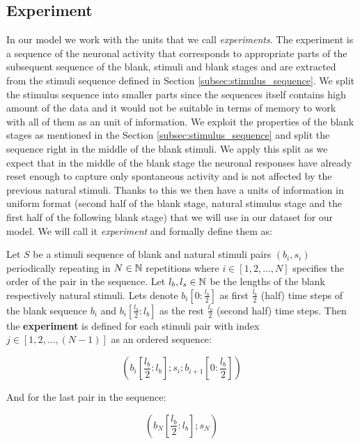 \subsection{Experiment}
\label{subsec:experiment}
In our model we work with the units that we call \emph{experiments}. The experiment is a sequence of the neuronal activity that corresponds to appropriate parts of the subsequent sequence of the blank, stimuli and blank stages and are extracted from the stimuli sequence defined in Section \ref{subsec:stimulus_sequence}. We split the stimulus sequence into smaller parts since the sequences itself contains high amount of the data and it would not be suitable in terms of memory to work with all of them as an unit of information. We exploit the properties of the blank stages as mentioned in the Section \ref{subsec:stimulus_sequence} and split the sequence right in the middle of the blank stimuli. We apply this split as we expect that in the middle of the blank stage the neuronal responses have already reset enough to capture only spontaneous activity and is not affected by the previous natural stimuli. Thanks to this we then have a units of information in uniform format (second half of the blank stage, natural stimulus stage and the first half of the following blank stage) that we will use in our dataset for our model. We will call it \emph{experiment} and formally define them as:

\begin{defn}[Experiment]
    Let $S$ be a stimuli sequence of blank and natural stimuli pairs $(b_i, s_i)$ periodically repeating in $N \in \mathbb{N}$ repetitions where $i \in [1, 2, \dots, N]$ specifies the order of the pair in the sequence. Let $l_{b}, l_{s} \in \mathbb{N}$ be the lengths of the blank respectively natural stimuli. Lets denote $b_i[0:\frac{l_b}{2}]$ as first $\frac{l_b}{2}$ (half) time steps of the blank sequence $b_i$ and $b_i[\frac{l_b}{2}:l_b]$ as the rest $\frac{l_b}{2}$ (second half) time steps. Then the \textbf{experiment} is defined for each stimuli pair with index $j \in [1, 2, \dots, (N-1)]$ as an ordered sequence:

    $$\left(b_i\left[\frac{l_b}{2}:l_b\right]; s_i; b_{i+1}\left[0:\frac{l_b}{2}\right]\right)$$

    And for the last pair in the sequence:

    $$\left(b_{N}\left[\frac{l_b}{2}:l_b\right]; s_{N}\right)$$
\end{defn}
\label{def:experiment}


